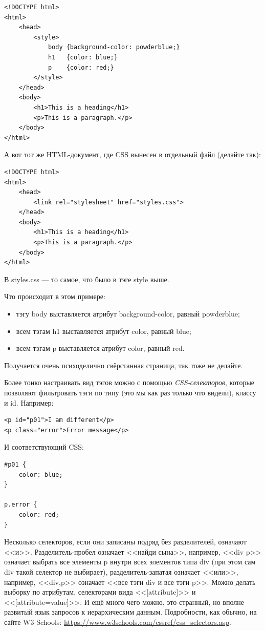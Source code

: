 \documentclass{../../text-style}
\begin{document}
\begin{verbatim}
<!DOCTYPE html>
<html>
    <head>
        <style>
            body {background-color: powderblue;}
            h1   {color: blue;}
            p    {color: red;}
        </style>
    </head>
    <body>
        <h1>This is a heading</h1>
        <p>This is a paragraph.</p>
    </body>
</html>
\end{verbatim}

А вот тот же HTML-документ, где CSS вынесен в отдельный файл (делайте так):

\begin{verbatim}
<!DOCTYPE html>
<html>
    <head>
        <link rel="stylesheet" href="styles.css">
    </head>
    <body>
        <h1>This is a heading</h1>
        <p>This is a paragraph.</p>
    </body>
</html>
\end{verbatim}

В styles.css --- то самое, что было в тэге style выше.

Что происходит в этом примере:

\begin{itemize}
    \item тэгу body выставляется атрибут background-color, равный powderblue;
    \item всем тэгам h1 выставляется атрибут color, равный blue;
    \item всем тэгам p выставляется атрибут color, равный red.
\end{itemize}

Получается очень психоделично свёрстанная страница, так тоже не делайте.

Более тонко настраивать вид тэгов можно с помощью \emph{CSS-селекторов}, которые позволяют фильтровать тэги по типу (это мы как раз только что видели), классу и id. Например:

\begin{verbatim}
<p id="p01">I am different</p>
<p class="error">Error message</p>
\end{verbatim}

И соответствующий CSS:

\begin{verbatim}
#p01 {
    color: blue;
}

p.error {
    color: red;
}
\end{verbatim}

Несколько селекторов, если они записаны подряд без разделителей, означают <<и>>. Разделитель-пробел означает <<найди сына>>, например, <<div p>> означает выбрать все элементы p внутри всех элементов типа div (при этом сам div такой селектор не выбирает), разделитель-запатая означает <<или>>, например, <<div,p>> означает <<все тэги div и все тэги p>>. Можно делать выборку по атрибутам, селекторами вида <<[attribute]>> и <<[attribute=value]>>. И ещё много чего можно, это странный, но вполне развитый язык запросов к иерархическим данным. Подробности, как обычно, на сайте W3 Schools: \url{https://www.w3schools.com/cssref/css_selectors.asp}.
\end{document}
